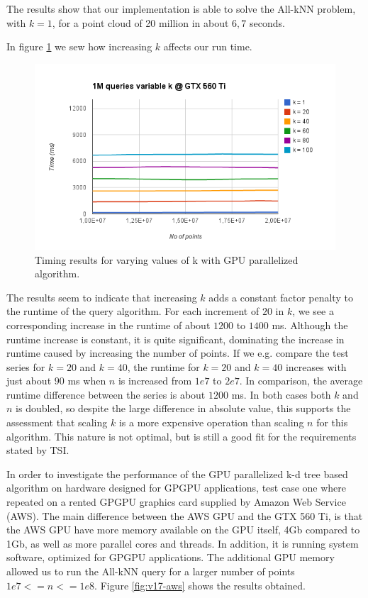 The results show that our implementation is able to solve the All-kNN problem, with $k=1$, for a point cloud of 20 million in about $6,7$ seconds.

In figure \ref{fig:v17-gpu-variable-k} we sew how increasing $k$ affects our run time.

\begin{figure}[ht!]
    \centering
    \includegraphics[width=120mm]{../gfx/v17-gpu-variable-k.png}
    \caption{Timing results for varying values of k with GPU parallelized algorithm.}
    \label{fig:v17-gpu-variable-k}
\end{figure}

The results seem to indicate that increasing $k$ adds a constant factor penalty to the runtime of the query algorithm. For each increment of $20$ in $k$, we see a corresponding increase in the runtime of about $1200$ to $1400$ ms. Although the runtime increase is constant, it is quite significant, dominating the increase in runtime caused by increasing the number of points. If we e.g. compare the test series for $k=20$ and $k=40$, the runtime for $k=20$ and $k=40$ increases with just about $90$ ms when $n$ is increased from $1e7$ to $2e7$. In comparison, the average runtime difference between the series is about $1200$ ms. In both cases both $k$ and $n$ is doubled, so despite the large difference in absolute value, this supports the assessment that scaling $k$ is a more expensive operation than scaling $n$ for this algorithm. This nature is not optimal, but is still a good fit for the requirements stated by TSI.

In order to investigate the performance of the GPU parallelized k-d tree based algorithm on hardware designed for GPGPU applications, test case one where repeated on a rented GPGPU graphics card supplied by Amazon Web Service (AWS). The main difference between the AWS GPU and the GTX 560 Ti, is that the AWS GPU have more memory available on the GPU itself, 4Gb compared to 1Gb, as well as more parallel cores and threads. In addition, it is running system software, optimized for GPGPU applications. The additional GPU memory allowed us to run the All-kNN query for a larger number of points $1e7<=n<=1e8$. Figure \ref{fig:v17-aws} shows the results obtained.

